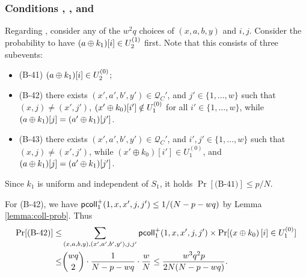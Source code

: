 
%

\subsubsection{Conditions \bfour, \bfive, and \bsix}


Regarding \bfour, consider any of the $w^2q$ choices of $(x,a,b,y)$ and $i, j$. Consider the probability to have $(a\oplus k_1)[i]\in U_2^{(1)}$ first. Note that this consists of three subevents:
\begin{itemize}
	\item(B-41) $(a\oplus k_1)[i]\in U_2^{(0)}$;
	\item(B-42) there exists $(x',a',b',y')\in\mathcal{Q}_{C}'$, and $j'\in\{1,\ldots,w\}$ such that $(x,j)\neq(x',j')$, $(x'\oplus k_0)[i']\notin U_1^{(0)}$ for all $i'\in\{1,\ldots,w\}$, while $(a\oplus k_1)[j]=(a'\oplus k_1)[j']$.
	\item(B-43) there exists $(x',a',b',y')\in\mathcal{Q}_{C}'$, and $i',j'\in\{1,\ldots,w\}$ such that $(x,j)\neq(x',j')$, while $\left(x' \oplus k_{0}\right)[i']\in U_1^{(0)}$, and $(a\oplus k_1)[j]=(a'\oplus k_1)[j']$.
\end{itemize}
Since $k_1$ is uniform and independent of $S_1$, it holds $\Pr[\text{(B-41)}]\leq p/N$.






For (B-42), we have $\mathsf{pcoll}_{1}^+(1,x,x',j,j')\leq1/(N-p-wq)$ by Lemma \ref{lemma:coll-prob}. Thus
%
\begin{align*}
\Pr[\text{(B-42)}] \leq  & \sum_{(x,a,b,y),(x',a',b',y'),j,j'}\mathsf{pcoll}_{1}^+(1,x,x',j,j')\times\Pr[\left(x \oplus k_{0}\right)[i]\in U_1^{(0)}]          \\
\leq  &  {wq\choose2}\cdot \frac{1}{N-p-wq}\cdot\frac{w}{N} \leq \frac{w^3q^2p}{2N(N-p-wq)} .
\end{align*}


